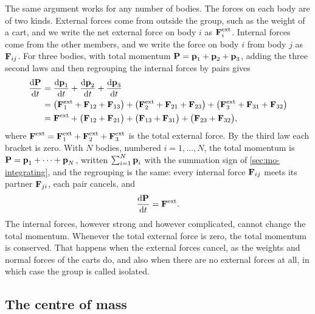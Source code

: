 The same argument works for any number of bodies. The forces on each body
are of two kinds. External forces come from outside the group, such as
the weight of a cart, and we write the net external force on body $i$ as
$\bm{\mathrm{F}}_i^{\mathrm{ext}}$. Internal forces come from the other members,
and we write the force on body $i$ from body $j$ as $\bm{\mathrm{F}}_{ij}$. For
three bodies, with total momentum $\bm{\mathrm{P}} = \bm{\mathrm{p}}_1 + \bm{\mathrm{p}}_2 +
\bm{\mathrm{p}}_3$, adding the three second laws and then regrouping the
internal forces by pairs gives
\begin{align*}
   \frac{\mathrm{d}\bm{\mathrm{P}}}{\mathrm{d} t}
   &= \frac{\mathrm{d}\bm{\mathrm{p}}_1}{\mathrm{d} t} + \frac{\mathrm{d}\bm{\mathrm{p}}_2}{\mathrm{d} t}
      + \frac{\mathrm{d}\bm{\mathrm{p}}_3}{\mathrm{d} t}\\
   &= \bigl(\bm{\mathrm{F}}_1^{\mathrm{ext}} + \bm{\mathrm{F}}_{12} + \bm{\mathrm{F}}_{13}\bigr)
      + \bigl(\bm{\mathrm{F}}_2^{\mathrm{ext}} + \bm{\mathrm{F}}_{21} + \bm{\mathrm{F}}_{23}\bigr)
      + \bigl(\bm{\mathrm{F}}_3^{\mathrm{ext}} + \bm{\mathrm{F}}_{31} + \bm{\mathrm{F}}_{32}\bigr)\\
   &= \bm{\mathrm{F}}^{\mathrm{ext}}
      + \bigl(\bm{\mathrm{F}}_{12} + \bm{\mathrm{F}}_{21}\bigr)
      + \bigl(\bm{\mathrm{F}}_{13} + \bm{\mathrm{F}}_{31}\bigr)
      + \bigl(\bm{\mathrm{F}}_{23} + \bm{\mathrm{F}}_{32}\bigr) ,
\end{align*}
where $\bm{\mathrm{F}}^{\mathrm{ext}} = \bm{\mathrm{F}}_1^{\mathrm{ext}} +
\bm{\mathrm{F}}_2^{\mathrm{ext}} + \bm{\mathrm{F}}_3^{\mathrm{ext}}$ is the total external
force. By the third law each bracket is zero. With $N$ bodies, numbered
$i = 1, \dots, N$, the total momentum is $\bm{\mathrm{P}} = \bm{\mathrm{p}}_1 + \dotsb +
\bm{\mathrm{p}}_N$, written $\sum_{i=1}^{N}\bm{\mathrm{p}}_i$ with the summation sign of
\cref{sec:mo-integrating}, and the regrouping is the same: every internal force $\bm{\mathrm{F}}_{ij}$ meets its
partner $\bm{\mathrm{F}}_{ji}$, each pair cancels, and
\begin{equation}
   \frac{\mathrm{d}\bm{\mathrm{P}}}{\mathrm{d} t} = \bm{\mathrm{F}}^{\mathrm{ext}} .
   \label{eq:ne-momentum}
\end{equation}
The internal forces, however strong and however complicated, cannot
change the total momentum. Whenever the total external force is zero,
the total momentum is conserved. That happens when the external forces
cancel, as the weights and normal forces of the carts do, and also when
there are no external forces at all, in which case the group is called
isolated.

\subsection*{The centre of mass}

